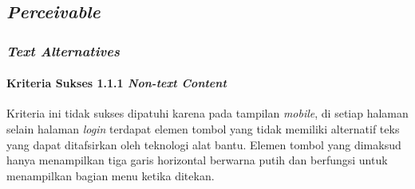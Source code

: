\subsection{\textit{Perceivable}}
\label{subsec:kepatuhan_bluetape_perceivable}

\subsubsection{\textit{Text Alternatives}}
\label{subsubsec:kepatuhan_bluetap_text_alternatives}

\paragraph{Kriteria Sukses 1.1.1 \textit{Non-text Content}}
\label{par:kepatuhan_bluetape_kriteria_sukses_1.1.1}
\par Kriteria ini tidak sukses dipatuhi karena pada tampilan \textit{mobile}, di setiap halaman selain halaman \textit{login} terdapat elemen tombol yang tidak memiliki alternatif teks yang dapat ditafsirkan oleh teknologi alat bantu. Elemen tombol yang dimaksud hanya menampilkan tiga garis horizontal berwarna putih dan berfungsi untuk menampilkan bagian menu ketika ditekan.